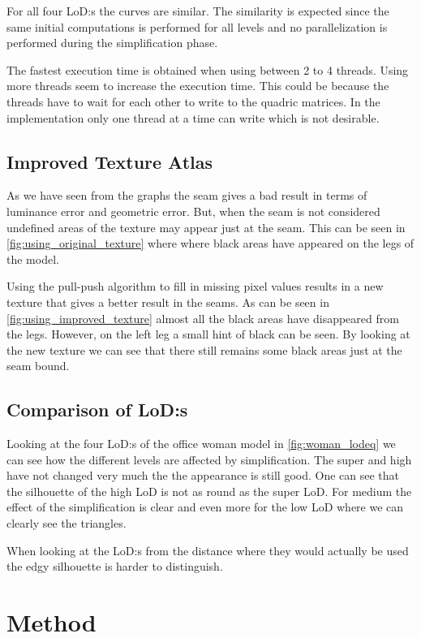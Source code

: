 For all four LoD:s the curves are similar. The similarity is expected since the same initial computations is performed for all levels and no parallelization is performed during the simplification phase.

The fastest execution time is obtained when using between 2 to 4 threads. Using more threads seem to increase the execution time. This could be because the threads have to wait for each other to write to the quadric matrices. In the implementation only one thread at a time can write which is not desirable.


\subsection{Improved Texture Atlas} \label{sec:discussion_texture}
As we have seen from the graphs the seam gives a bad result in terms of luminance error and geometric error. But, when the seam is not considered undefined areas of the texture may appear just at the seam. This can be seen in \cref{fig:using_original_texture} where where black areas have appeared on the legs of the model.

Using the pull-push algorithm to fill in missing pixel values results in a new texture that gives a better result in the seams. As can be seen in \cref{fig:using_improved_texture} almost all the black areas have disappeared from the legs. However, on the left leg a small hint of black can be seen. By looking at the new texture we can see that there still remains some black areas just at the seam bound.


\subsection{Comparison of LoD:s} \label{sec:discussion_lod}
Looking at the four LoD:s of the office woman model in \cref{fig:woman_lodeq} we can see how the different levels are affected by simplification. The super and high have not changed very much the the appearance is still good. One can see that the silhouette of the high LoD is not as round as the super LoD. For medium the effect of the simplification is clear and even more for the low LoD where we can clearly see the triangles.

When looking at the LoD:s from the distance where they would actually be used the edgy silhouette is harder to distinguish. 

\clearpage

\section{Method} \label{sec:discussion_method}
